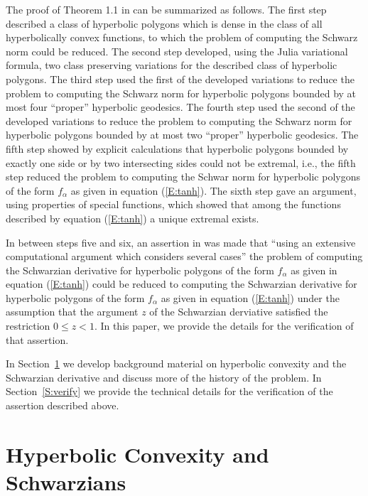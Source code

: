 \documentclass[12pt]{icgft}
\theoremstyle{definition}
\numberwithin{equation}{section}
\begin{document}
The proof of Theorem 1.1 in \cite{BCPW} can be summarized as follows.  The first step
described a class of hyperbolic polygons which is dense in the class of all hyperbolically
convex functions, to which the problem of computing the Schwarz norm could be reduced.
The second step developed, using the Julia variational formula, two
class preserving variations for the described class of hyperbolic polygons.
The third step used the first of the developed variations to reduce the problem to computing the
Schwarz norm for hyperbolic polygons bounded by at most four ``proper'' hyperbolic geodesics.
The fourth step used the second of the developed variations to reduce the problem to computing the
Schwarz norm for hyperbolic polygons bounded by at most two ``proper'' hyperbolic geodesics.
The fifth step showed by explicit calculations that hyperbolic polygons bounded
by exactly one side or by two intersecting sides could not be extremal, i.e.,
the fifth step reduced the problem to computing the Schwar norm for hyperbolic polygons of the form
$f_{\alpha}$ as given in equation (\ref{E:tanh}).
The sixth step gave an argument, using properties of special functions, which showed that among the functions described by equation (\ref{E:tanh}) a unique extremal exists.

In between steps five and six, an assertion in \cite{BCPW} was made that ``using an extensive computational  argument which considers several cases'' the problem of computing the Schwarzian derivative for hyperbolic polygons of the form $f_{\alpha}$ as given in equation (\ref{E:tanh}) could be reduced to computing the Schwarzian derivative for hyperbolic polygons of the form
$f_{\alpha}$ as given in equation (\ref{E:tanh}) under the assumption that the argument $z$ of the Schwarzian derviative satisfied the restriction $0 \le z < 1$.  In this paper, we provide the details for the verification of that assertion.



In Section~\ref{S:hypercon} we develop background material on
hyperbolic convexity and the Schwarzian derivative and discuss more of
the history of the problem.  In Section~\ref{S:verify} we provide the technical details for the
verification of the assertion described above.


\section{Hyperbolic Convexity and Schwarzians}\label{S:hypercon}
\end{document}

